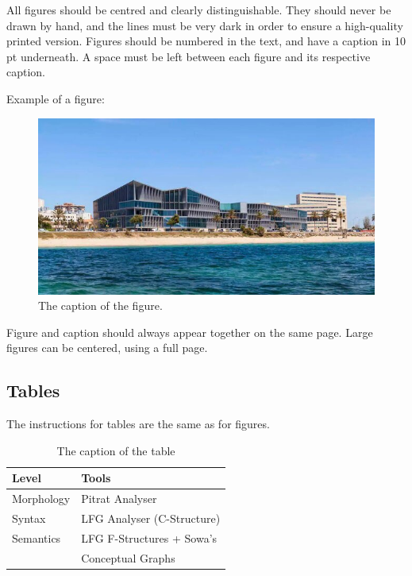 \documentclass[10pt, a4paper]{article}
\begin{document}
All figures should be centred and clearly distinguishable. They should never be drawn by hand, and the lines must be very dark in order to ensure a high-quality printed version. Figures should be numbered in the text, and have a caption in  10 pt underneath. A space must be left between each figure and its respective caption. 

Example of a figure:

\begin{figure}[!ht]
\begin{center}
\includegraphics[width=\columnwidth]{home-palacio.jpg}
\caption{The caption of the figure.}
\label{fig.1}
\end{center}
\end{figure}

Figure and caption should always appear together on the same page. Large figures can be centered, using a full page.

\subsection{Tables}

The instructions for tables are the same as for figures.

\begin{table}[!ht]
\begin{center}
\begin{tabularx}{\columnwidth}{|l|X|}

      \hline
      Level&Tools\\
      \hline
      Morphology & Pitrat Analyser\\
      \hline
      Syntax & LFG Analyser (C-Structure)\\
      \hline
     Semantics & LFG F-Structures + Sowa's\\
     & Conceptual Graphs\\
      \hline

\end{tabularx}
\caption{The caption of the table}
 \end{center}
\end{table}
\end{document}

